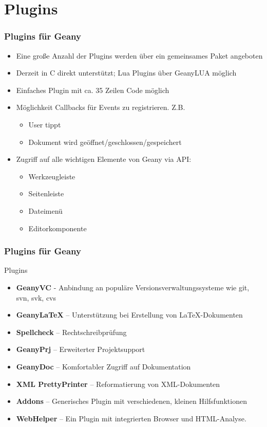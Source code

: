 \section{Plugins}
\begin{frame}
  \frametitle{Plugins für Geany}
  \begin{block}{}
    \begin{itemize}
    \item Eine große Anzahl der Plugins werden über ein gemeinsames
      Paket angeboten
    \item Derzeit in C direkt unterstützt; Lua Plugins über GeanyLUA
      möglich
    \item Einfaches Plugin mit ca. 35 Zeilen Code möglich
    \item Möglichkeit Callbacks für Events zu registrieren. Z.B.
      \begin{itemize}
        \item User tippt
        \item Dokument wird geöffnet/geschlossen/gespeichert
      \end{itemize}
    \item Zugriff auf alle wichtigen Elemente von Geany via API:
      \begin{itemize}
        \item Werkzeugleiste
        \item Seitenleiste
        \item Dateimenü
        \item Editorkomponente
      \end{itemize}
    \end{itemize}
  \end{block}
\end{frame}

\begin{frame}
  \frametitle{Plugins für Geany}
  \begin{block}{Plugins}
    \begin{itemize}
    \item \textbf{GeanyVC} - Anbindung an populäre
        Versions\-ver\-waltungs\-systeme wie git, svn, svk, cvs
    \item \textbf{GeanyLaTeX} -- Unterstützung bei Erstellung von
        \LaTeX-Dokumenten
    \item \textbf{Spellcheck} -- Rechtschreibprüfung
    \item \textbf{GeanyPrj} -- Erweiterter Projektsupport
    \item \textbf{GeanyDoc} -- Komfortabler Zugriff auf Dokumentation
    \item \textbf{XML PrettyPrinter} -- Reformatierung von XML-Dokumenten
    \item \textbf{Addons} -- Generisches Plugin mit verschiedenen,
          kleinen Hilfsfunktionen
    \item \textbf{WebHelper} -- Ein Plugin mit integrierten Browser
          und HTML-Analyse.
    \end{itemize}
  \end{block}
\end{frame}

